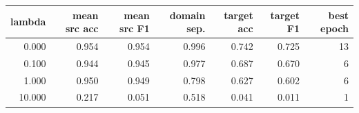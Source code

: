 \begin{tabular}{rrrrrrr}
\toprule
lambda & mean src acc & mean src F1 & domain sep. & target acc & target F1 & best epoch \\
\midrule
0.000 & 0.954 & 0.954 & 0.996 & 0.742 & 0.725 & 13 \\
0.100 & 0.944 & 0.945 & 0.977 & 0.687 & 0.670 & 6 \\
1.000 & 0.950 & 0.949 & 0.798 & 0.627 & 0.602 & 6 \\
10.000 & 0.217 & 0.051 & 0.518 & 0.041 & 0.011 & 1 \\
\bottomrule
\end{tabular}
